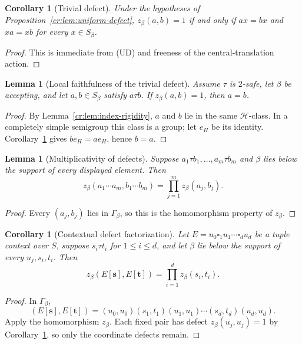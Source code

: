 \documentclass[10pt,a4paper]{article}
\newtheorem{lemma}[theorem]{Lemma}
\newtheorem{corollary}[theorem]{Corollary}
\theoremstyle{definition}
\theoremstyle{remark}
\newcommand{\blank}{\square}
\begin{document}
\begin{corollary}[Trivial defect]
\label{cr:cor:trivial-defect}
Under the hypotheses of Proposition~\ref{cr:lem:uniform-defect},
\(z_\beta(a,b)=1\) if and only if \(ax=bx\) and \(xa=xb\) for every
\(x\in S_\beta\).
\end{corollary}

\begin{proof}
This is immediate from \textup{(UD)} and freeness of the central-translation
action.
\end{proof}

\begin{lemma}[Local faithfulness of the trivial defect]
\label{cr:lem:local-faithfulness}
Assume \(\tau\) is \(2\)-safe, let \(\beta\) be accepting, and let
\(a,b\in S_\beta\) satisfy \(a\tau b\).  If \(z_\beta(a,b)=1\), then
\(a=b\).
\end{lemma}

\begin{proof}
By Lemma~\ref{cr:lem:index-rigidity}, \(a\) and \(b\) lie in the same
\(\mathcal H\)-class.  In a completely simple semigroup this class is a group;
let \(e_H\) be its identity.  Corollary~\ref{cr:cor:trivial-defect} gives
\(be_H=ae_H\), hence \(b=a\).
\end{proof}

\begin{lemma}[Multiplicativity of defects]
\label{cr:lem:defect-product}
Suppose \(a_1\tau b_1,\ldots,a_m\tau b_m\) and \(\beta\) lies below the
support of every displayed element.  Then
\[
z_\beta(a_1\cdots a_m,b_1\cdots b_m)
=\prod_{j=1}^m z_\beta(a_j,b_j).
\]
\end{lemma}

\begin{proof}
Every \((a_j,b_j)\) lies in \(\Gamma_\beta\), so this is the homomorphism
property of \(z_\beta\).
\end{proof}

\begin{corollary}[Contextual defect factorization]
\label{cr:cor:context-defect}
Let \(E=u_0\blank_1u_1\cdots\blank_du_d\) be a tuple context over \(S\),
suppose \(s_i\tau t_i\) for \(1\le i\le d\), and let \(\beta\) lie below
the support of every \(u_j,s_i,t_i\).  Then
\[
z_\beta(E[\mathbf s],E[\mathbf t])
=\prod_{i=1}^d z_\beta(s_i,t_i).
\tag{CD}
\]
\end{corollary}

\begin{proof}
In \(\Gamma_\beta\),
\[
(E[\mathbf s],E[\mathbf t])
=(u_0,u_0)(s_1,t_1)(u_1,u_1)\cdots(s_d,t_d)(u_d,u_d).
\]
Apply the homomorphism \(z_\beta\).  Each fixed pair has defect
\(z_\beta(u_j,u_j)=1\) by Corollary~\ref{cr:cor:trivial-defect}, so only the
coordinate defects remain.
\end{proof}
\end{document}

